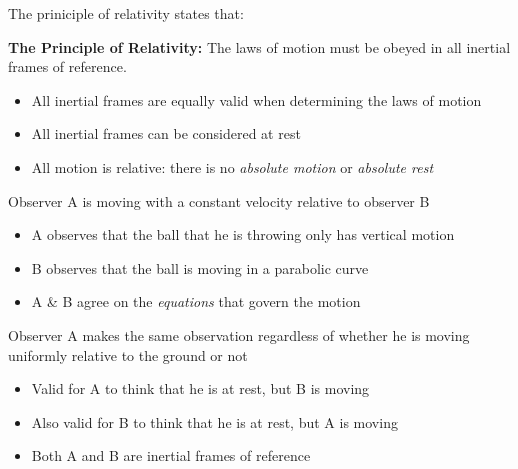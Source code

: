 The priniciple of relativity states that:
\begin{definition}
  \textbf{The Principle of Relativity:} The laws of motion must be
  obeyed in all inertial frames of reference.
\end{definition}
\begin{itemize}
\item All inertial frames are equally valid when determining the laws of
  motion
\item All inertial frames can be considered at rest
\item All motion is relative: there is no \emph{absolute motion} or
    \emph{absolute rest}
\end{itemize}
%
%
%
%
Observer A is moving with a constant velocity relative to observer B
\begin{itemize}
\item A observes that the ball that he is throwing only has vertical motion
\item B observes that the ball is moving in a parabolic curve
\item A \& B agree on the \emph{equations} that govern the motion
\end{itemize}
\begin{center}
\end{center}
Observer A makes the same observation regardless of whether he is moving
uniformly relative to the ground or not
\begin{itemize}
\item Valid for A to think that he is at rest, but B is moving
\item Also valid for B to think that he is at rest, but A is moving
\item Both A and B are inertial frames of reference
\end{itemize}
%
%
%
%
